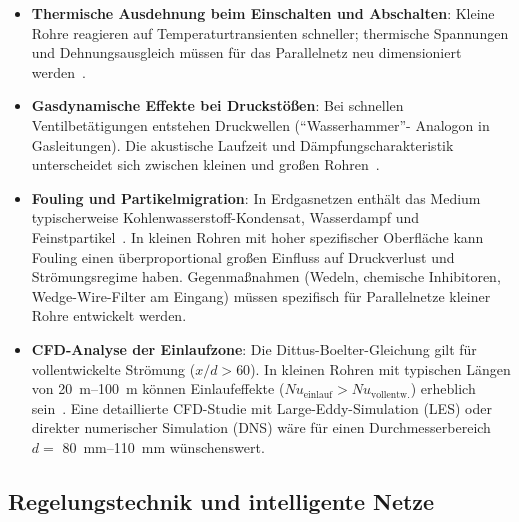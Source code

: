 ﻿\documentclass[12pt,a4paper,twoside]{article}
\theoremstyle{plain}
\theoremstyle{definition}
\theoremstyle{remark}
\begin{document}
\begin{itemize}
  \item \textbf{Thermische Ausdehnung beim Einschalten und Abschalten}:
        Kleine Rohre reagieren auf Temperaturtransienten schneller;
        thermische Spannungen und Dehnungsausgleich müssen
        für das Parallelnetz neu dimensioniert werden~\cite{TimoshenkoWoinowsky2009}.

  \item \textbf{Gasdynamische Effekte bei Druckstößen}:
        Bei schnellen Ventilbetätigungen entstehen Druckwellen (``Wasserhammer''-
        Analogon in Gasleitungen).
        Die akustische Laufzeit und Dämpfungscharakteristik unterscheidet sich
        zwischen kleinen und großen Rohren~\cite{Wylie1993}.

  \item \textbf{Fouling und Partikelmigration}:
        In Erdgasnetzen enthält das Medium typischerweise Kohlenwasserstoff-Kondensat,
        Wasserdampf und Feinstpartikel~\cite{Mokhatab2019}.
        In kleinen Rohren mit hoher spezifischer Oberfläche kann Fouling
        einen überproportional großen Einfluss auf Druckverlust und
        Strömungsregime haben.
        Gegenmaßnahmen (Wedeln, chemische Inhibitoren, Wedge-Wire-Filter am
        Eingang) müssen spezifisch für Parallelnetze kleiner Rohre entwickelt
        werden.

  \item \textbf{CFD-Analyse der Einlaufzone}:
        Die Dittus-Boelter-Gleichung gilt für vollentwickelte Strömung
        ($x/d > 60$).
        In kleinen Rohren mit typischen Längen von \SIrange{20}{100}{\metre}
        können Einlaufeffekte ($Nu_{\text{einlauf}} > Nu_{\text{vollentw.}}$)
        erheblich sein~\cite{Shah1978}.
        Eine detaillierte CFD-Studie mit Large-Eddy-Simulation (LES) oder
        direkter numerischer Simulation (DNS) wäre für einen Durchmesserbereich
        $d = $ \SIrange{80}{110}{\milli\metre} wünschenswert.
\end{itemize}

\subsection{Regelungstechnik und intelligente Netze}
\label{ssec:ausblick_regelung}
\end{document}
